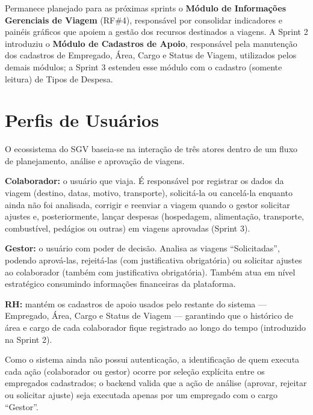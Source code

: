 \documentclass[12pt,article,oneside,a4paper]{abntex2}
\begin{document}
Permanece planejado para as próximas sprints o \textbf{Módulo de Informações
Gerenciais de Viagem} (RF\#4), responsável por consolidar indicadores e
painéis gráficos que apoiem a gestão dos recursos destinados a viagens. A
Sprint 2 introduziu o \textbf{Módulo de Cadastros de Apoio}, responsável pela
manutenção dos cadastros de Empregado, Área, Cargo e Status de Viagem,
utilizados pelos demais módulos; a Sprint 3 estendeu esse módulo com o
cadastro (somente leitura) de Tipos de Despesa.

\section{Perfis de Usuários}

O ecossistema do SGV baseia-se na interação de três atores dentro de um fluxo
de planejamento, análise e aprovação de viagens.

\textbf{Colaborador:} o usuário que viaja. É responsável por registrar os
dados da viagem (destino, datas, motivo, transporte), solicitá-la ou
cancelá-la enquanto ainda não foi analisada, corrigir e reenviar a viagem
quando o gestor solicitar ajustes e, posteriormente, lançar despesas
(hospedagem, alimentação, transporte, combustível, pedágios ou outras) em
viagens aprovadas (Sprint 3).

\textbf{Gestor:} o usuário com poder de decisão. Analisa as viagens
``Solicitadas'', podendo aprová-las, rejeitá-las (com justificativa
obrigatória) ou solicitar ajustes ao colaborador (também com justificativa
obrigatória). Também atua em nível estratégico consumindo informações
financeiras da plataforma.

\textbf{RH:} mantém os cadastros de apoio usados pelo restante do sistema ---
Empregado, Área, Cargo e Status de Viagem --- garantindo que o histórico de
área e cargo de cada colaborador fique registrado ao longo do tempo
(introduzido na Sprint 2).

Como o sistema ainda não possui autenticação, a identificação de quem executa
cada ação (colaborador ou gestor) ocorre por seleção explícita entre os
empregados cadastrados; o backend valida que a ação de análise (aprovar,
rejeitar ou solicitar ajuste) seja executada apenas por um empregado com o
cargo ``Gestor''.

\end{document}
